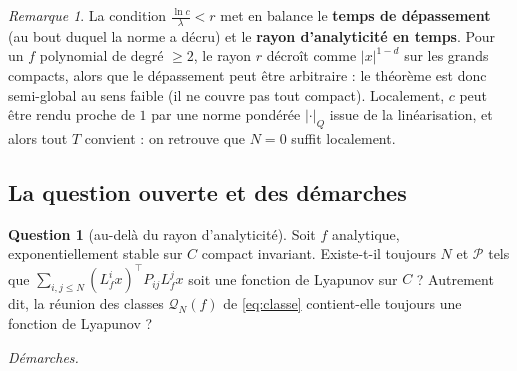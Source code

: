 \documentclass[11pt,a4paper]{article}
\theoremstyle{definition}
\newtheorem{question}{Question}
\theoremstyle{remark}
\newtheorem{remark}[theorem]{Remarque}
\newcommand{\tr}{^{\top}}
\begin{document}
\begin{remark}
La condition $\frac{\ln c}{\lambda}<r$ met en balance le \textbf{temps de dépassement} (au bout duquel la norme a décru) et le \textbf{rayon d'analyticité en temps}. Pour un $f$ polynomial de degré $\ge2$, le rayon $r$ décroît comme $|x|^{1-d}$ sur les grands compacts, alors que le dépassement peut être arbitraire : le théorème est donc semi-global au sens faible (il ne couvre pas tout compact). Localement, $c$ peut être rendu proche de $1$ par une norme pondérée $|\cdot|_Q$ issue de la linéarisation, et alors tout $T$ convient : on retrouve que $N=0$ suffit localement.
\end{remark}

\subsection{La question ouverte et des démarches}
\begin{question}[au-delà du rayon d'analyticité]\label{q:NL}
Soit $f$ analytique, exponentiellement stable sur $C$ compact invariant. Existe-t-il toujours $N$ et $\mathcal P$ tels que $\sum_{i,j\le N}(L_f^ix)\tr P_{ij}L_f^jx$ soit une fonction de Lyapunov sur $C$ ? Autrement dit, la réunion des classes $\mathcal Q_N(f)$ de \eqref{eq:classe} contient-elle toujours une fonction de Lyapunov ?
\end{question}
\noindent\emph{Démarches.}
\end{document}
